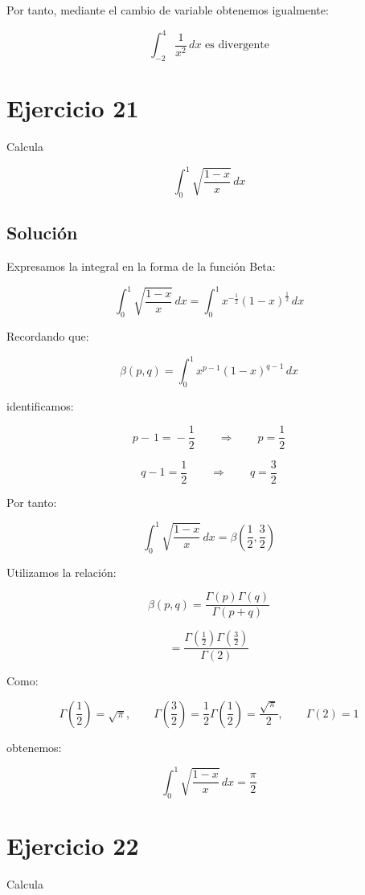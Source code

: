 \documentclass[fleqn]{article}
\begin{document}
	Por tanto, mediante el cambio de variable obtenemos igualmente:

	\[
	\boxed{
	\int_{-2}^{4}\frac{1}{x^2}\,dx
	\text{ es divergente}
	}
	\]

\section{Ejercicio 21}
	Calcula

	\[
	\int_0^1\sqrt{\frac{1-x}{x}}\,dx
	\]

	\subsection{Solución}

	Expresamos la integral en la forma de la función Beta:

	\[
	\int_0^1\sqrt{\frac{1-x}{x}}\,dx
	=
	\int_0^1
	x^{-\frac{1}{2}}
	(1-x)^{\frac{1}{2}}
	\,dx
	\]

	Recordando que:

	\[
	\beta(p,q)
	=
	\int_0^1
	x^{p-1}(1-x)^{q-1}\,dx
	\]

	identificamos:

	\[
	p-\frac{}{}1=\!-\frac{1}{2}
	\qquad\Longrightarrow\qquad
	p=\frac{1}{2}
	\]

	\[
	q-1=\frac{1}{2}
	\qquad\Longrightarrow\qquad
	q=\frac{3}{2}
	\]

	Por tanto:

	\[
	\int_0^1\sqrt{\frac{1-x}{x}}\,dx
	=
	\beta\left(\frac{1}{2},\frac{3}{2}\right)
	\]

	Utilizamos la relación:

	\[
	\beta(p,q)
	=
	\frac{\Gamma(p)\Gamma(q)}
	{\Gamma(p+q)}
	\]

	\[
	=
	\frac{
	\Gamma\left(\frac{1}{2}\right)
	\Gamma\left(\frac{3}{2}\right)
	}{
	\Gamma(2)
	}
	\]

	Como:

	\[
	\Gamma\left(\frac{1}{2}\right)=\sqrt{\pi},
	\qquad
	\Gamma\left(\frac{3}{2}\right)
	=
	\frac{1}{2}\Gamma\left(\frac{1}{2}\right)
	=
	\frac{\sqrt{\pi}}{2},
	\qquad
	\Gamma(2)=1
	\]

	obtenemos:

	\[
	\boxed{
	\int_0^1\sqrt{\frac{1-x}{x}}\,dx
	=
	\frac{\pi}{2}
	}
	\]

\section{Ejercicio 22}
	Calcula
\end{document}
